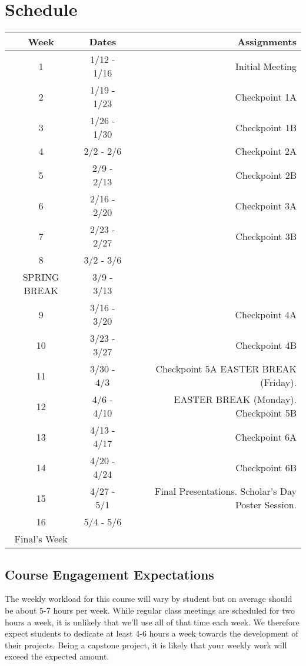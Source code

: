 \documentclass[10pt]{article}
\begin{document}
\section{Schedule}

\begin{center}
\begin{tabular}{|c|c|r|}
\hline 
Week & Dates & Assignments \\
\hline
1 & 1/12 - 1/16 & Initial Meeting \\
\hline
2 & 1/19 - 1/23 & Checkpoint 1A\\
\hline
3 & 1/26 - 1/30 & Checkpoint 1B  \\
\hline
4 & 2/2 - 2/6 &  Checkpoint 2A \\
\hline
5 & 2/9 - 2/13 &  Checkpoint 2B \\
\hline
6 & 2/16 - 2/20 & Checkpoint 3A \\
\hline
7 & 2/23 - 2/27 & Checkpoint 3B  \\
\hline
8 & 3/2 - 3/6 &   \\
\hline 
SPRING BREAK & 3/9 - 3/13 &  \\
\hline
9 & 3/16 - 3/20 & Checkpoint 4A\\
\hline
10 & 3/23 - 3/27 & Checkpoint 4B\\
\hline
11 & 3/30 - 4/3 & Checkpoint 5A EASTER BREAK (Friday).\\
\hline
12 & 4/6 - 4/10 & EASTER BREAK (Monday). Checkpoint 5B\\
\hline
13 & 4/13 - 4/17 &  Checkpoint 6A \\
\hline
14 & 4/20 - 4/24 &  Checkpoint 6B\\
\hline
15 & 4/27 - 5/1 & Final Presentations. Scholar's Day Poster Session. \\ 
\hline
16 & 5/4 - 5/6 & \\
\hline
Final's Week &  &  \\ 
\hline
\end{tabular}
\end{center}

\subsection{Course Engagement Expectations}

The weekly workload for this course will vary by student but on average should be about 5-7 hours per week.  While regular class meetings are scheduled for two hours a week, it is unlikely that we'll use all of that time each week.  We therefore expect students to dedicate at least 4-6 hours a week towards the development of their projects.  Being a capstone project, it is likely that your weekly work will exceed the expected amount.
\end{document}

